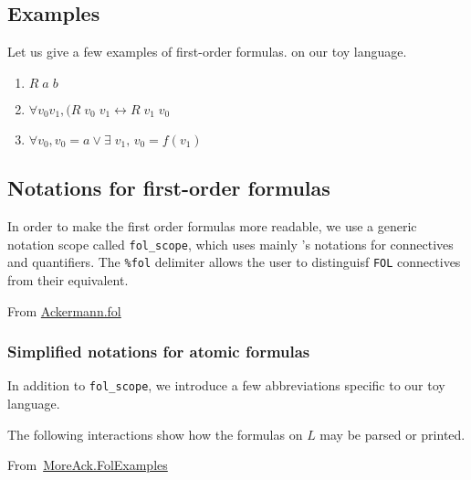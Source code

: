 
\subsection{Examples}




Let us give a few examples of first-order formulas. on our toy language.

\label{fol:examplesf1f2f3}
\begin{enumerate}
\item $R\;a\;b$
\item $\forall v_0 v_1, (R\;v_0\;v_1 \leftrightarrow R\;v_1\;v_0$
\item $ \forall v_0, v_0=a \vee \exists\;v_1,\, v_0= f(v_1)$
\end{enumerate}



\subsection{Notations for first-order formulas}

In order to make the first order formulas more readable, we use a generic notation scope called \texttt{fol\_scope}, which uses mainly \coq's 
notations for connectives and quantifiers. The \texttt{\%fol} delimiter 
allows the user to distinguisf \texttt{FOL} connectives from their \coq equivalent.


\vspace{6pt}

\noindent From \href{../theories/html/hydras.Ackermann.fol.html}{Ackermann.fol}


\subsubsection{Simplified notations for atomic formulas}
\label{sec:fol-atomic-notations}

In addition to \texttt{fol\_scope}, we introduce a few abbreviations specific to our toy language.


The following interactions show how the formulas on $L$ may be 
parsed or printed.

\noindent From~\href{../theories/html/hydras.MoreAck.FolExamples.html}{MoreAck.FolExamples}

